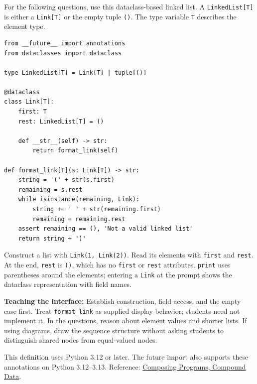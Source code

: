 For the following questions, use this dataclass-based linked list.
A \lstinline{LinkedList[T]} is either a \lstinline{Link[T]} or the empty tuple
\lstinline{()}. The type variable \lstinline{T} describes the element type.

\begin{lstlisting}
from __future__ import annotations
from dataclasses import dataclass

type LinkedList[T] = Link[T] | tuple[()]

@dataclass
class Link[T]:
    first: T
    rest: LinkedList[T] = ()

    def __str__(self) -> str:
        return format_link(self)

def format_link[T](s: Link[T]) -> str:
    string = '(' + str(s.first)
    remaining = s.rest
    while isinstance(remaining, Link):
        string += ' ' + str(remaining.first)
        remaining = remaining.rest
    assert remaining == (), 'Not a valid linked list'
    return string + ')'
\end{lstlisting}

Construct a list with \lstinline{Link(1, Link(2))}. Read its elements with
\lstinline{first} and \lstinline{rest}. At the end, \lstinline{rest} is
\lstinline{()}, which has no \lstinline{first} or \lstinline{rest} attributes.
\lstinline{print} uses parentheses around the elements; entering a \lstinline{Link}
at the prompt shows the dataclass representation with field names.

\begin{meta}
\textbf{Teaching the interface:} Establish construction, field access, and the
empty case first. Treat \lstinline{format_link} as supplied display behavior;
students need not implement it. In the questions, reason about element values
and shorter lists. If using diagrams, draw the sequence structure without
asking students to distinguish shared nodes from equal-valued nodes.

This definition uses Python 3.12 or later. The future import also supports
these annotations on Python 3.12--3.13. Reference:
\href{https://composingprograms.com/3ed/compound-data/}{Composing Programs, Compound Data}.
\end{meta}
